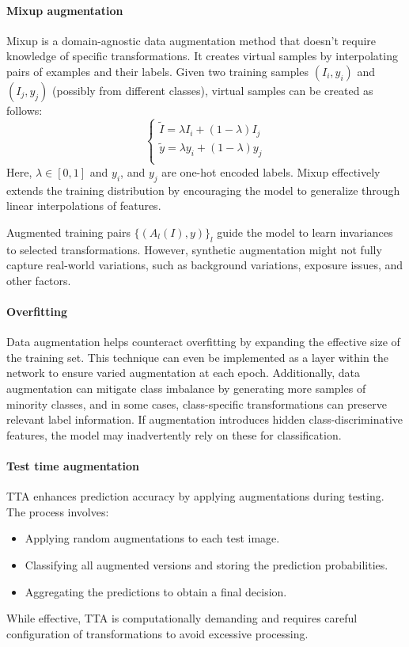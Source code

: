 \paragraph*{Mixup augmentation}
Mixup is a domain-agnostic data augmentation method that doesn't require knowledge of specific transformations. 
It creates virtual samples by interpolating pairs of examples and their labels.
Given two training samples $(I_i,y_i)$ and $(I_j,y_j)$ (possibly from different classes), virtual samples can be created as follows:
\[\begin{cases}
    \tilde{I}=\lambda I_i+(1-\lambda)I_j \\
    \tilde{y}=\lambda y_i+(1-\lambda)y_j \\
\end{cases}\]
Here, $\lambda \in [0,1]$ and $y_i$, and $y_j$ are one-hot encoded labels.
Mixup effectively extends the training distribution by encouraging the model to generalize through linear interpolations of features.

Augmented training pairs $\{(A_l(I),y)\}_l$ guide the model to learn invariances to selected transformations. 
However, synthetic augmentation might not fully capture real-world variations, such as background variations, exposure issues, and other factors.

\paragraph*{Overfitting}
Data augmentation helps counteract overfitting by expanding the effective size of the training set. 
This technique can even be implemented as a layer within the network to ensure varied augmentation at each epoch. 
Additionally, data augmentation can mitigate class imbalance by generating more samples of minority classes, and in some cases, class-specific transformations can preserve relevant label information.
If augmentation introduces hidden class-discriminative features, the model may inadvertently rely on these for classification.

\paragraph*{Test time augmentation}
TTA enhances prediction accuracy by applying augmentations during testing. 
The process involves: 
\begin{itemize} 
    \item Applying random augmentations to each test image. 
    \item Classifying all augmented versions and storing the prediction probabilities. 
    \item Aggregating the predictions to obtain a final decision. 
\end{itemize}
While effective, TTA is computationally demanding and requires careful configuration of transformations to avoid excessive processing.

